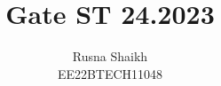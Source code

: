 \documentclass{article}[]
\begin{document}
\title{Gate ST 24.2023}
\author{Rusna Shaikh\\EE22BTECH11048}
\date{}
\maketitle{}
\providecommand{\pr}[1]{\ensuremath{\Pr\left(#1\right)}}
\providecommand{\prt}[2]{\ensuremath{p_{#1}^{\left(#2\right)} }}        %
\providecommand{\qfunc}[1]{\ensuremath{Q\left(#1\right)}}
\providecommand{\sbrak}[1]{\ensuremath{{}\left[#1\right]}}
\providecommand{\lsbrak}[1]{\ensuremath{{}\left[#1\right.}}
\providecommand{\rsbrak}[1]{\ensuremath{{}\left.#1\right]}}
\providecommand{\brak}[1]{\ensuremath{\left(#1\right)}}
\providecommand{\lbrak}[1]{\ensuremath{\left(#1\right.}}
\providecommand{\rbrak}[1]{\ensuremath{\left.#1\right)}}
\providecommand{\cbrak}[1]{\ensuremath{\left\{#1\right\}}}
\providecommand{\lcbrak}[1]{\ensuremath{\left\{#1\right.}}
\providecommand{\rcbrak}[1]{\ensuremath{\left.#1\right\}}}
\newcommand{\sgn}{\mathop{\mathrm{sgn}}}
\providecommand{\abs}[1]{\left\vert#1\right\vert}
\providecommand{\res}[1]{\Res\displaylimits_{#1}} 
\providecommand{\norm}[1]{\left\lVert#1\right\rVert}
\providecommand{\mtx}[1]{\mathbf{#1}}
\providecommand{\mean}[1]{E\left[ #1 \right]}
\providecommand{\cond}[2]{#1\middle|#2}
\providecommand{\fourier}{\overset{\mathcal{F}}{ \rightleftharpoons}}
\newenvironment{amatrix}[1]{%
  \left(\begin{array}{@{}*{#1}{c}|c@{}}
}{%
  \end{array}\right)
}
\newcommand{\solution}{\noindent \textbf{Solution: }}
\newcommand{\cosec}{\,\text{cosec}\,}
\providecommand{\dec}[2]{\ensuremath{\overset{#1}{\underset{#2}{\gtrless}}}}
\newcommand{\mydet}[1]{\ensuremath{\begin{vmatrix}#1\end{vmatrix}}}
\newcommand{\myaugvec}[2]{\ensuremath{\begin{amatrix}{#1}#2\end{amatrix}}}
\providecommand{\rank}{\text{rank}}
\providecommand{\pr}[1]{\ensuremath{\Pr\left(#1\right)}}
\providecommand{\qfunc}[1]{\ensuremath{Q\left(#1\right)}}
\end{document}
